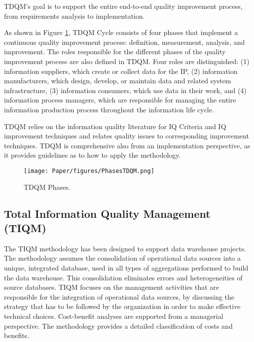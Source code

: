 \documentclass[pdftex,english,oribibl]{llncs}
\begin{document}
TDQM's goal is to support the entire end-to-end quality improvement process, from requirements analysis to implementation.

As shown in Figure \ref{fig:PhasesTDQM}, TDQM Cycle consists of four phases that implement a continuous quality improvement process: definition, measurement, analysis, and improvement.
The roles responsible for the different phases of the quality improvement process are also defined in TDQM.
Four roles are distinguished: (1) information suppliers, which create or collect data for the IP, (2) information manufacturers, which design, develop, or maintain data and related system infrastructure, (3) information consumers, which use data in their work, and  (4) information process managers, which are responsible for managing the entire information production process throughout the information life cycle.

TDQM relies on the information quality literature for IQ Criteria and IQ improvement techniques and relates quality issues to corresponding improvement techniques.
TDQM is comprehensive also from an implementation perspective, as it provides guidelines as to how to apply the methodology.

\begin{comment}
In applying TDQM, an organization must:
(a) clearly understand the IPs;
(b) establish an IP team consisting of a senior executive as the TDQM champion, an IP engineer who is familiar with the TDQM methodology, and members who are information suppliers, manufacturers, consumers, and IP managers;
(c) teach IQ assessment and IQ management to all the IP constituencies; and
(d) institutionalize continuous IP improvement.
\end{comment}


\begin{figure}
    \centering
    \texttt{[image: Paper/figures/PhasesTDQM.png]}
    \caption{TDQM Phases.}
    \label{fig:PhasesTDQM}
 \end{figure}

\subsection{Total Information Quality Management (TIQM)}

The TIQM methodology \cite{English1999TIQM} has been designed to support data warehouse projects. The methodology assumes the consolidation of operational data sources into a unique, integrated database, used in all types of aggregations performed to build the data warehouse. This consolidation eliminates errors and heterogeneities of source databases. TIQM focuses on the management activities that are responsible for the integration of operational data sources, by discussing the strategy that has to be followed by the organization in order to make effective technical choices. Cost-benefit analyses are supported from a managerial perspective. The methodology provides a detailed classification of costs and benefits.
\end{document}
